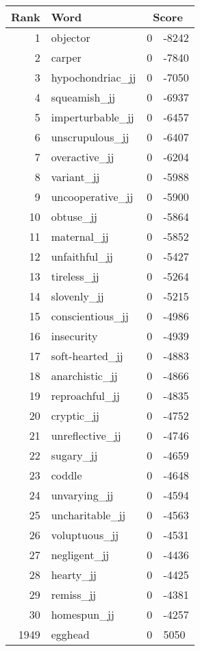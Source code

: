 \begin{longtable}[!htbp]{| rlr@{.}l |}
    \hline
    \textbf{Rank} & \textbf{Word} & \multicolumn{2}{c|}{\textbf{Score}} \\
    \hline
    \endhead
    1 & objector & 0 & -8242 \\
    2 & carper & 0 & -7840 \\
    3 & hypochondriac\_jj & 0 & -7050 \\
    4 & squeamish\_jj & 0 & -6937 \\
    5 & imperturbable\_jj & 0 & -6457 \\
    6 & unscrupulous\_jj & 0 & -6407 \\
    7 & overactive\_jj & 0 & -6204 \\
    8 & variant\_jj & 0 & -5988 \\
    9 & uncooperative\_jj & 0 & -5900 \\
    10 & obtuse\_jj & 0 & -5864 \\
    11 & maternal\_jj & 0 & -5852 \\
    12 & unfaithful\_jj & 0 & -5427 \\
    13 & tireless\_jj & 0 & -5264 \\
    14 & slovenly\_jj & 0 & -5215 \\
    15 & conscientious\_jj & 0 & -4986 \\
    16 & insecurity & 0 & -4939 \\
    17 & soft-hearted\_jj & 0 & -4883 \\
    18 & anarchistic\_jj & 0 & -4866 \\
    19 & reproachful\_jj & 0 & -4835 \\
    20 & cryptic\_jj & 0 & -4752 \\
    21 & unreflective\_jj & 0 & -4746 \\
    22 & sugary\_jj & 0 & -4659 \\
    23 & coddle & 0 & -4648 \\
    24 & unvarying\_jj & 0 & -4594 \\
    25 & uncharitable\_jj & 0 & -4563 \\
    26 & voluptuous\_jj & 0 & -4531 \\
    27 & negligent\_jj & 0 & -4436 \\
    28 & hearty\_jj & 0 & -4425 \\
    29 & remiss\_jj & 0 & -4381 \\
    30 & homespun\_jj & 0 & -4257 \\
    1949 & egghead & 0 & 5050 \\

\end{longtable}
